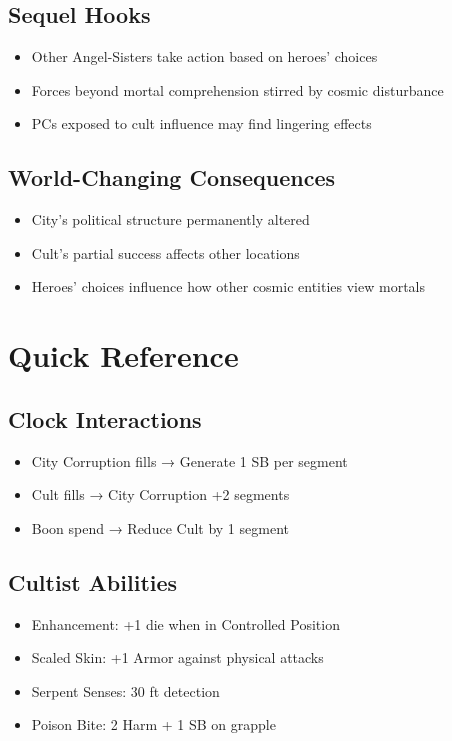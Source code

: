 \documentclass[11pt]{article}
\begin{document}
\subsection*{Sequel Hooks}
\begin{itemize}
    \item Other Angel-Sisters take action based on heroes' choices
    \item Forces beyond mortal comprehension stirred by cosmic disturbance
    \item PCs exposed to cult influence may find lingering effects
\end{itemize}

\subsection*{World-Changing Consequences}
\begin{itemize}
    \item City's political structure permanently altered
    \item Cult's partial success affects other locations
    \item Heroes' choices influence how other cosmic entities view mortals
\end{itemize}

\section*{Quick Reference}

\subsection*{Clock Interactions}
\begin{itemize}
    \item City Corruption fills → Generate 1 SB per segment
    \item Cult fills → City Corruption +2 segments
    \item Boon spend → Reduce Cult by 1 segment
\end{itemize}

\subsection*{Cultist Abilities}
\begin{itemize}
    \item Enhancement: +1 die when in Controlled Position
    \item Scaled Skin: +1 Armor against physical attacks
    \item Serpent Senses: 30 ft detection
    \item Poison Bite: 2 Harm + 1 SB on grapple
\end{itemize}
\end{document}
